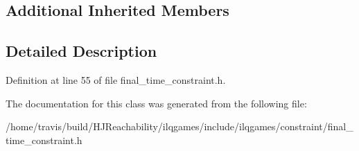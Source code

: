 \subsection*{Additional Inherited Members}


\subsection{Detailed Description}


Definition at line 55 of file final\+\_\+time\+\_\+constraint.\+h.



The documentation for this class was generated from the following file\+:\begin{DoxyCompactItemize}
\item 
/home/travis/build/\+H\+J\+Reachability/ilqgames/include/ilqgames/constraint/final\+\_\+time\+\_\+constraint.\+h\end{DoxyCompactItemize}
